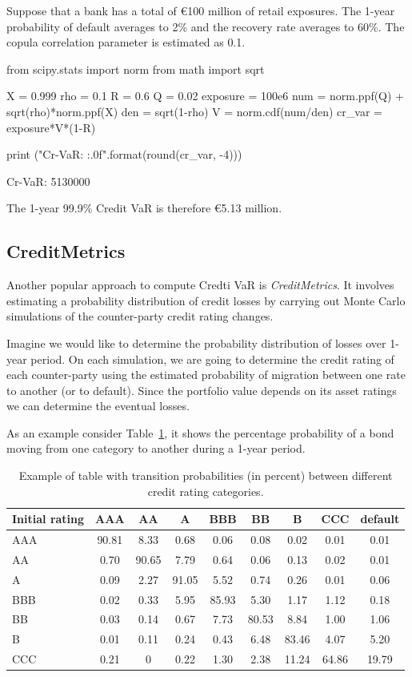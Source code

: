 Suppose that a bank has a total of \euro{100} million of retail exposures. The 1-year probability of default averages to 2\% and the recovery rate averages to 60\%. The copula correlation parameter is estimated as 0.1.

\begin{ipython}
from scipy.stats import norm
from math import sqrt

X = 0.999
rho = 0.1
R = 0.6
Q = 0.02
exposure = 100e6
num = norm.ppf(Q) + sqrt(rho)*norm.ppf(X)
den = sqrt(1-rho)
V = norm.cdf(num/den)
cr_var = exposure*V*(1-R)

print ("Cr-VaR: {:.0f}".format(round(cr_var, -4)))
\end{ipython}
\begin{ioutput}
Cr-VaR: 5130000
\end{ioutput}
\noindent
The 1-year 99.9\% Credit VaR is therefore \euro{5.13} million.

\subsection{CreditMetrics}
Another popular approach to compute Credti VaR is \emph{CreditMetrics}. It involves estimating a probability distribution of credit losses by carrying out Monte Carlo simulations of the counter-party credit rating changes.

Imagine we would like to determine the probability distribution of losses over 1-year period. On each simulation, we are going to determine the credit rating of each counter-party using the estimated probability of migration between one rate to another (or to default). Since the portfolio value depends on its asset ratings we can determine the eventual losses. 

As an example consider Table~\ref{tab:credit_ratings}, it shows the percentage probability of a bond moving from one category to another during a 1-year period.

\begin{table}[htb]
	\centering
	\begin{tabular}{|l|c|c|c|c|c|c|c|c|}
	\hline
	Initial rating & AAA & AA & A & BBB & BB & B & CCC & default \\
	\hline
	\hline
	AAA & 90.81 & 8.33 & 0.68 & 0.06 & 0.08 & 0.02 & 0.01& 0.01 \\ 
	\hline
	AA & 0.70 & 90.65 & 7.79 & 0.64 & 0.06 & 0.13 & 0.02 & 0.01 \\ 
	\hline
	A & 0.09 & 2.27 & 91.05 & 5.52 & 0.74 & 0.26 & 0.01 & 0.06 \\ 
	\hline
	BBB & 0.02 & 0.33 & 5.95 & 85.93 & 5.30 & 1.17 & 1.12 & 0.18 \\
	\hline
	BB & 0.03 & 0.14 & 0.67 & 7.73 & 80.53 & 8.84 & 1.00 & 1.06 \\
	\hline
	B & 0.01 & 0.11 & 0.24 & 0.43 & 6.48 & 83.46 & 4.07 & 5.20 \\
	\hline
	CCC & 0.21 & 0 & 0.22 & 1.30 & 2.38 & 11.24 & 64.86 & 19.79 \\		
	\hline
\end{tabular}
\caption{Example of table with transition probabilities (in percent) between different credit rating categories.}
\label{tab:credit_ratings}
\end{table}

